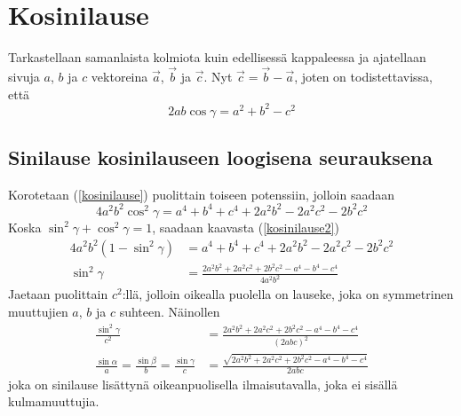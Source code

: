 \documentclass[a4paper,12pt]{amsart}
\begin{document}
\section{Kosinilause}
Tarkastellaan samanlaista kolmiota kuin edellisessä kappaleessa ja ajatellaan sivuja $a$, $b$ ja $c$ vektoreina $\vec{a}$, $\vec{b}$ ja $\vec{c}$. Nyt $\vec{c}=\vec{b}-\vec{a}$, joten on todistettavissa, että
\begin{equation}\label{kosinilause}
2ab\cos\gamma=a^2+b^2-c^2
\end{equation}
\subsection{Sinilause kosinilauseen loogisena seurauksena}
Korotetaan (\ref{kosinilause}) puolittain toiseen potenssiin, jolloin saadaan
\begin{equation}\label{kosinilause2}
4a^2 b^2\cos^2\gamma=a^4+b^4+c^4+2a^2 b^2-2a^2 c^2-2b^2 c^2
\end{equation}
Koska $\sin^2\gamma+\cos^2\gamma=1$, saadaan kaavasta (\ref{kosinilause2})
\begin{equation}\label{sini2}
\begin{split}
4a^2 b^2(1-\sin^2\gamma) &= a^4+b^4+c^4+2a^2 b^2-2a^2 c^2-2b^2 c^2 \\
\sin^2\gamma&= \frac{2a^2 b^2+2a^2 c^2+2b^2 c^2-a^4-b^4-c^4}{4a^2 b^2}
\end{split}
\end{equation}
Jaetaan puolittain $c^2$:llä, jolloin oikealla puolella on lauseke, joka on symmetrinen muuttujien $a$, $b$ ja $c$ suhteen. Näinollen
\begin{equation}
\begin{split}
\frac{\sin^2\gamma}{c^2}&= \frac{2a^2 b^2+2a^2 c^2+2b^2 c^2-a^4-b^4-c^4}{(2abc)^2} \\
\frac{\sin\alpha}{a}=\frac{\sin\beta}{b}=\frac{\sin\gamma}{c}&=
\frac{\sqrt{2a^2 b^2+2a^2 c^2+2b^2 c^2-a^4-b^4-c^4}}{2abc}
\end{split}
\end{equation}
joka on sinilause lisättynä oikeanpuolisella ilmaisutavalla, joka ei sisällä kulmamuuttujia.
\end{document}
